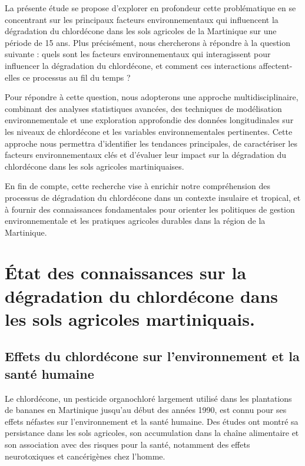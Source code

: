 \documentclass{report}
\begin{document}
La présente étude se propose d'explorer en profondeur cette problématique en se concentrant sur les principaux facteurs environnementaux qui influencent la dégradation du chlordécone dans les sols agricoles de la Martinique sur une période de 15 ans. Plus précisément, nous chercherons à répondre à la question suivante : quels sont les facteurs environnementaux qui interagissent pour influencer la dégradation du chlordécone, et comment ces interactions affectent-elles ce processus au fil du temps ?

Pour répondre à cette question, nous adopterons une approche multidisciplinaire, combinant des analyses statistiques avancées, des techniques de modélisation environnementale et une exploration approfondie des données longitudinales sur les niveaux de chlordécone et les variables environnementales pertinentes. Cette approche nous permettra d'identifier les tendances principales, de caractériser les facteurs environnementaux clés et d'évaluer leur impact sur la dégradation du chlordécone dans les sols agricoles martiniquaises.

En fin de compte, cette recherche vise à enrichir notre compréhension des processus de dégradation du chlordécone dans un contexte insulaire et tropical, et à fournir des connaissances fondamentales pour orienter les politiques de gestion environnementale et les pratiques agricoles durables dans la région de la Martinique.

\chapter*{État des connaissances sur la dégradation du chlordécone dans les sols agricoles martiniquais.}

\section{Effets du chlordécone sur l'environnement et la santé humaine}
Le chlordécone, un pesticide organochloré largement utilisé dans les plantations de bananes en Martinique jusqu'au début des années 1990, est connu pour ses effets néfastes sur l'environnement et la santé humaine. Des études ont montré sa persistance dans les sols agricoles, son accumulation dans la chaîne alimentaire et son association avec des risques pour la santé, notamment des effets neurotoxiques et cancérigènes chez l'homme.
\end{document}
